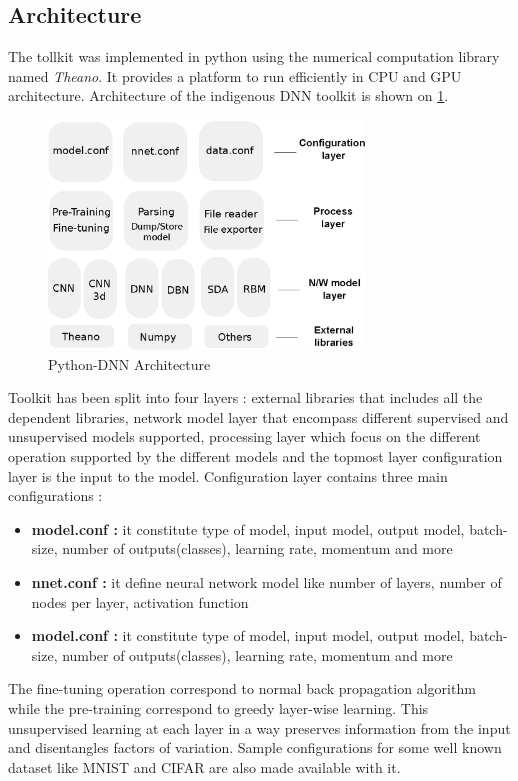 \subsection{Architecture}
The tollkit was implemented in python using the numerical computation library named \textit{Theano}.  It provides a platform to run efficiently in CPU and GPU architecture.  Architecture of the indigenous DNN toolkit is shown on \ref{fig:architecture}.
\begin{figure}[htpb]
   \begin{center}
	    \includegraphics[width=0.75\textwidth]{snaps/architecture.eps}     
     \caption {Python-DNN Architecture}
	 \label{fig:architecture}
   \end{center}
 \end{figure}
Toolkit has been split into four layers : external libraries that includes all the dependent libraries, network model layer that encompass different supervised and unsupervised models supported, processing layer which focus on the different operation supported by the different models and the topmost layer configuration layer is the input to the model.  Configuration layer contains three main configurations : 
 \begin{itemize}
	\item {\textbf{model.conf :} it constitute type of model, input model, output model, batch-size, number of outputs(classes), learning rate, momentum and more}
	\item {\textbf{nnet.conf :} it define neural network model like number of layers, number of nodes per layer, activation function}
	\item {\textbf{model.conf :} it constitute type of model, input model, output model, batch-size, number of outputs(classes), learning rate, momentum and more}
 \end{itemize}
The fine-tuning operation correspond to normal back propagation algorithm while the pre-training correspond to greedy layer-wise learning.  This unsupervised learning at each layer in a way preserves information from the input and disentangles factors of variation.  Sample configurations for some well known dataset like MNIST and CIFAR are also made available with it.
